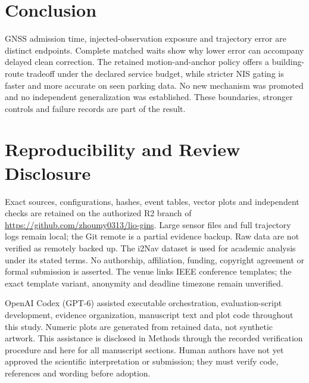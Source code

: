 \documentclass[conference]{IEEEtran}
\begin{document}
\section{Conclusion}
GNSS admission time, injected-observation exposure and trajectory error are distinct endpoints. Complete matched waits show why lower error can accompany delayed clean correction. The retained motion-and-anchor policy offers a building-route tradeoff under the declared service budget, while stricter NIS gating is faster and more accurate on seen parking data. No new mechanism was promoted and no independent generalization was established. These boundaries, stronger controls and failure records are part of the result.

\section*{Reproducibility and Review Disclosure}
Exact sources, configurations, hashes, event tables, vector plots and independent checks are retained on the authorized R2 branch of \url{https://github.com/zhoumy0313/lio-gins}. Large sensor files and full trajectory logs remain local; the Git remote is a partial evidence backup. Raw data are not verified as remotely backed up. The i2Nav dataset is used for academic analysis under its stated terms. No authorship, affiliation, funding, copyright agreement or formal submission is asserted. The venue links IEEE conference templates; the exact template variant, anonymity and deadline timezone remain unverified.

OpenAI Codex (GPT-6) assisted executable orchestration, evaluation-script development, evidence organization, manuscript text and plot code throughout this study. Numeric plots are generated from retained data, not synthetic artwork. This assistance is disclosed in Methods through the recorded verification procedure and here for all manuscript sections. Human authors have not yet approved the scientific interpretation or submission; they must verify code, references and wording before adoption.


\end{document}
